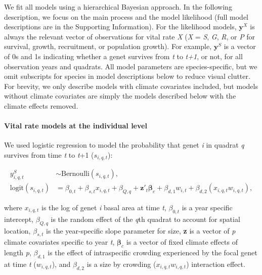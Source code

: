 \documentclass[12pt,]{article}
\begin{document}
We fit all models using a hierarchical Bayesian approach. In the
following description, we focus on the main process and the model
likelihood (full model descriptions are in the Supporting Information).
For the likelihood models, \(\textbf{y}^X\) is always the relevant
vector of observations for vital rate \emph{X} (\emph{X} = \emph{S},
\emph{G}, \emph{R}, or \emph{P} for survival, growth, recruitment, or
population growth). For example, \(\textbf{y}^S\) is a vector of 0s and
1s indicating whether a genet survives from \emph{t} to \emph{t+1}, or
not, for all observation years and quadrats. All model parameters are
species-specific, but we omit subscripts for species in model
descriptions below to reduce visual clutter. For brevity, we only
describe models with climate covariates included, but models without
climate covariates are simply the models described below with the
climate effects removed.

\paragraph{Vital rate models at the individual
level}\label{vital-rate-models-at-the-individual-level}

We used logistic regression to model the probability that genet \emph{i}
in quadrat \emph{q} survives from time \emph{t} to \emph{t}+1
(\(s_{i,q,t}\)):

\vspace{-3em}\begin{align}
y_{i,q,t}^{S} &\sim \text{Bernoulli}(s_{i,q,t}), \\
\text{logit}(s_{i,q,t}) &= \beta_{0,t} + \beta_{s,t}x_{i,q,t} + \beta_{Q,q} + \textbf{z}'_t \boldsymbol{\beta}_c + \beta_{d,1} w_{i,t} + \beta_{d,2} (x_{i,q,t}w_{i,q,t}),
\end{align}\vspace{-3em}

where \(x_{i,q,t}\) is the log of genet \emph{i} basal area at time
\emph{t}, \(\beta_{0,t}\) is a year specific intercept, \(\beta_{Q,q}\)
is the random effect of the \emph{q}th quadrat to account for spatial
location, \(\beta_{s,t}\) is the year-specific slope parameter for size,
\textbf{z} is a vector of \emph{p} climate covariates specific to year
\emph{t}, \(\boldsymbol{\beta}_c\) is a vector of fixed climate effects
of length \emph{p}, \(\beta_{d,1}\) is the effect of intraspecific
crowding experienced by the focal genet at time \emph{t}
(\(w_{i,q,t}\)), and \(\beta_{d,2}\) is a size by crowding
(\(x_{i,q,t}w_{i,q,t}\)) interaction effect.
\end{document}
